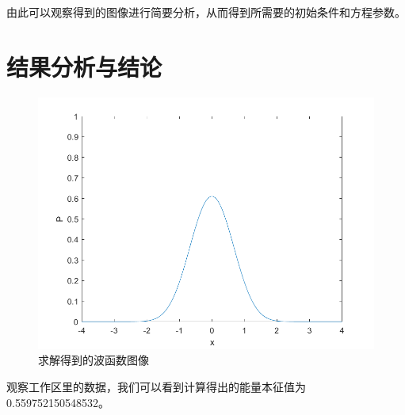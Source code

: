\documentclass[UTF8,a4paper,10pt]{ctexart}
\begin{document}
由此可以观察得到的图像进行简要分析，从而得到所需要的初始条件和方程参数。
\section{结果分析与结论}

	\begin{figure}[!htbp]
		\centering
		\includegraphics[width=1\textwidth,height=0.75\textwidth]{pictures/psi.png}
		\caption{求解得到的波函数图像} \label{p1}
	\end{figure}
观察工作区里的数据，我们可以看到计算得出的能量本征值为0.559752150548532。




\end{document}
